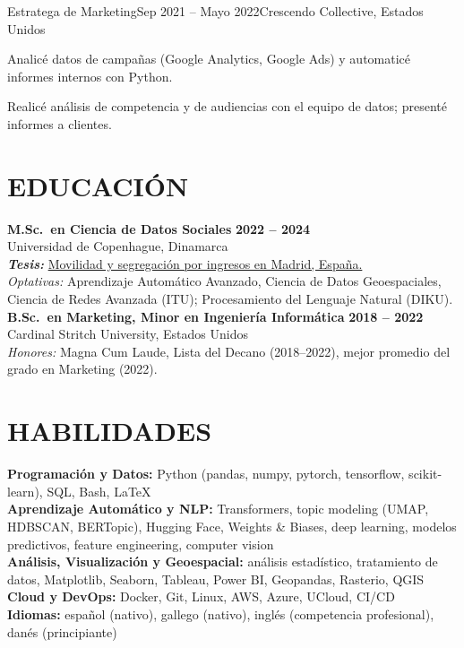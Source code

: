 \documentclass{resume}
\begin{document}
\begin{content}
    \begin{position}{Estratega de Marketing}{Sep 2021 -- Mayo 2022}{Crescendo Collective, Estados Unidos}{}{}
        \item Analicé datos de campañas (Google Analytics, Google Ads) y automaticé informes internos con Python.
        \item Realicé análisis de competencia y de audiencias con el equipo de datos; presenté informes a clientes.
    \end{position}

\end{content}

\section{EDUCACIÓN}
\begin{content}
    {\bf M.Sc.\ en Ciencia de Datos Sociales} \hfill {\bf 2022 -- 2024} \\
    Universidad de Copenhague, Dinamarca \\
    {\bf \em Tesis:} {\href{https://github.com/carobs9/segregation-madrid}{Movilidad y segregación por ingresos en Madrid, España.}} \\
    {\small {\em Optativas:} Aprendizaje Automático Avanzado, Ciencia de Datos Geoespaciales, Ciencia de Redes Avanzada (ITU); Procesamiento del Lenguaje Natural (DIKU).} \\[0.4em]
    {\bf B.Sc.\ en Marketing, Minor en Ingeniería Informática} \hfill {\bf 2018 -- 2022} \\
    Cardinal Stritch University, Estados Unidos \\
    {\small {\em Honores:} Magna Cum Laude, Lista del Decano (2018--2022), mejor promedio del grado en Marketing (2022).}
\end{content}

\section{HABILIDADES}
\begin{content}
    {\bf Programación y Datos:} Python {\footnotesize (pandas, numpy, pytorch, tensorflow, scikit-learn)}, SQL, Bash, \LaTeX \\
    {\bf Aprendizaje Automático y NLP:} Transformers, topic modeling {\footnotesize (UMAP, HDBSCAN, BERTopic)}, Hugging Face, Weights \& Biases, deep learning, modelos predictivos, feature engineering, computer vision \\
    {\bf Análisis, Visualización y Geoespacial:} análisis estadístico, tratamiento de datos, Matplotlib, Seaborn, Tableau, Power BI, Geopandas, Rasterio, QGIS \\
    {\bf Cloud y DevOps:} Docker, Git, Linux, AWS, Azure, UCloud, CI/CD \\
    {\bf Idiomas:} español {\footnotesize (nativo)}, gallego {\footnotesize (nativo)}, inglés {\footnotesize (competencia profesional)}, danés {\footnotesize (principiante)}
\end{content}
\end{document}
